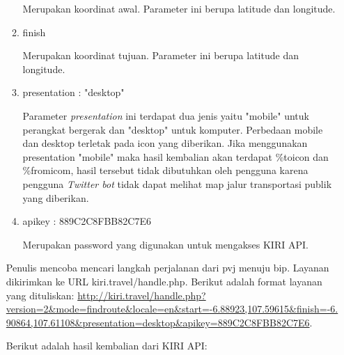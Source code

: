 \begin{itemize}
\begin{enumerate}
		Merupakan koordinat awal. Parameter ini berupa latitude dan longitude.
		\item finish
		
		Merupakan koordinat tujuan. Parameter ini berupa latitude dan longitude.
		\item presentation : "desktop"
		
		Parameter \textit{presentation} ini terdapat dua jenis yaitu "mobile" untuk perangkat bergerak dan "desktop" untuk komputer. Perbedaan mobile dan desktop terletak pada icon yang diberikan. Jika menggunakan presentation "mobile" maka hasil kembalian akan terdapat \%toicon dan \%fromicom, hasil tersebut tidak dibutuhkan oleh pengguna karena pengguna \textit{Twitter bot} tidak dapat melihat map jalur transportasi publik yang diberikan.
		\item apikey : 889C2C8FBB82C7E6
		
		Merupakan password yang digunakan untuk mengakses KIRI API.
	\end{enumerate}
	
	Penulis mencoba mencari langkah perjalanan dari pvj menuju bip. Layanan dikirimkan ke URL kiri.travel/handle.php. Berikut adalah format layanan yang dituliskan:
	\url{http://kiri.travel/handle.php?version=2\&mode=findroute\&locale=en\&start=-6.88923,107.59615\&finish=-6.90864,107.61108\&presentation=desktop\&apikey=889C2C8FBB82C7E6}.
	
	Berikut adalah hasil kembalian dari KIRI API:
	

\end{itemize}
